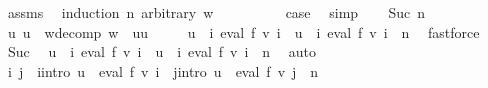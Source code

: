 \begin{isabellebody}
%
\isadelimproof
%
\endisadelimproof
%
\isatagproof
{}\isamarkupfalse%
\ assms\ \isamarkupfalse%
\ {\isacharparenleft}{\kern0pt}induction\ n\ arbitrary{\isacharcolon}{\kern0pt}\ w{\isacharparenright}{\kern0pt}\isanewline
\ \ \isamarkupfalse%
\ {}\isanewline
\ \ \isamarkupfalse%
\ \isamarkupfalse%
\ {\isacharquery}{\kern0pt}case\ \isamarkupfalse%
\ simp\isanewline
{}\isamarkupfalse%
\isanewline
\ \ \isamarkupfalse%
\ {\isacharparenleft}{\kern0pt}Suc\ n{\isacharparenright}{\kern0pt}\isanewline
\ \ \isamarkupfalse%
\ \isamarkupfalse%
\ u\ u{\isacharprime}{\kern0pt}\ \ w{\isacharunderscore}{\kern0pt}decomp{\isacharcolon}{\kern0pt}\ {\isachardoublequoteopen}w\ {\isacharequal}{\kern0pt}\ u{\isacharat}{\kern0pt}u{\isacharprime}{\kern0pt}{\isachardoublequoteclose}\ \isanewline
\ \ \ \ {\isachardoublequoteopen}u\ {\isasymin}\ {\isacharparenleft}{\kern0pt}{\isasymUnion}i{\isachardot}{\kern0pt}\ eval\ f\ {\isacharparenleft}{\kern0pt}v\ i{\isacharparenright}{\kern0pt}{\isacharparenright}{\kern0pt}\ {\isasymand}\ u{\isacharprime}{\kern0pt}\ {\isasymin}\ {\isacharparenleft}{\kern0pt}{\isasymUnion}i{\isachardot}{\kern0pt}\ eval\ f\ {\isacharparenleft}{\kern0pt}v\ i{\isacharparenright}{\kern0pt}{\isacharparenright}{\kern0pt}\ {\isacharcircum}{\kern0pt}{\isacharcircum}{\kern0pt}\ n{\isachardoublequoteclose}\ \isamarkupfalse%
\ fastforce\isanewline
\ \ \isamarkupfalse%
\ Suc\ \isamarkupfalse%
\ {\isachardoublequoteopen}u\ {\isasymin}\ {\isacharparenleft}{\kern0pt}{\isasymUnion}i{\isachardot}{\kern0pt}\ eval\ f\ {\isacharparenleft}{\kern0pt}v\ i{\isacharparenright}{\kern0pt}{\isacharparenright}{\kern0pt}\ {\isasymand}\ u{\isacharprime}{\kern0pt}\ {\isasymin}\ {\isacharparenleft}{\kern0pt}{\isasymUnion}i{\isachardot}{\kern0pt}\ eval\ f\ {\isacharparenleft}{\kern0pt}v\ i{\isacharparenright}{\kern0pt}\ {\isacharcircum}{\kern0pt}{\isacharcircum}{\kern0pt}\ n{\isacharparenright}{\kern0pt}{\isachardoublequoteclose}\ \isamarkupfalse%
\ auto\isanewline
\ \ \isamarkupfalse%
\ \isamarkupfalse%
\ i\ j\ \ i{\isacharunderscore}{\kern0pt}intro{\isacharcolon}{\kern0pt}\ {\isachardoublequoteopen}u\ {\isasymin}\ eval\ f\ {\isacharparenleft}{\kern0pt}v\ i{\isacharparenright}{\kern0pt}{\isachardoublequoteclose}\ \ j{\isacharunderscore}{\kern0pt}intro{\isacharcolon}{\kern0pt}\ {\isachardoublequoteopen}u{\isacharprime}{\kern0pt}\ {\isasymin}\ eval\ f\ {\isacharparenleft}{\kern0pt}v\ j{\isacharparenright}{\kern0pt}\ {\isacharcircum}{\kern0pt}{\isacharcircum}{\kern0pt}\ n{\isachardoublequoteclose}\ \isamarkupfalse%

\end{isabellebody}
